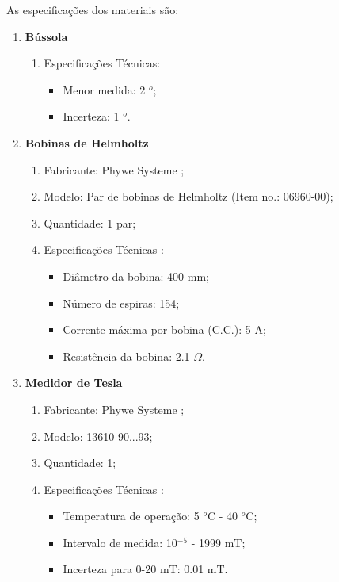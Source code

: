\documentclass[reprint,amsmath,amssymb,aps]{revtex4-2}
\begin{document}
As especificações dos materiais são:
\begin{enumerate}
    \item \textbf{Bússola}
    \begin{enumerate}
        \item Especificações Técnicas:
        \begin{itemize}
            \item Menor medida: 2 $^o$;
            \item Incerteza: 1 $^o$.
        \end{itemize}
    \end{enumerate}
    \item \textbf{Bobinas de Helmholtz}
    \begin{enumerate}
        \item Fabricante: Phywe Systeme \textregistered;
        \item Modelo: Par de bobinas de Helmholtz (Item no.: 06960-00); 
        \item Quantidade: 1 par;
        \item Especificações Técnicas \cite{bobinas}:
        \begin{itemize}
            \item Diâmetro da bobina: 400 mm;
            \item Número de espiras: 154;
            \item Corrente máxima por bobina (C.C.): 5 A;
            \item Resistência da bobina: 2.1 $\Omega$.
        \end{itemize}
    \end{enumerate}
    
   \item \textbf{Medidor de Tesla}
    \begin{enumerate}
        \item Fabricante: Phywe Systeme \textregistered;
        \item Modelo: 13610-90...93; 
        \item Quantidade: 1;
        \item Especificações Técnicas \cite{teslameter}:
        \begin{itemize}
            \item Temperatura de operação: 5 $^o$C - 40 $^o$C;
            \item Intervalo de medida: 10$^{-5}$ - 1999 mT;
            \item Incerteza para 0-20 mT: 0.01 mT.
        \end{itemize}
    \end{enumerate}
    

\end{enumerate}
\end{document}

